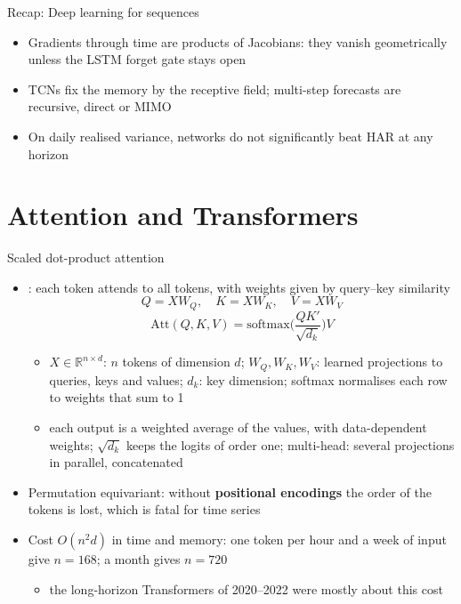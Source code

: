 \begin{frame}{Recap: Deep learning for sequences}
\itemsize{\small}
\begin{itemize}
    \item Gradients through time are products of Jacobians: they vanish geometrically unless the LSTM forget gate stays open
    \item TCNs fix the memory by the receptive field; multi-step forecasts are recursive, direct or MIMO
    \item On daily realised variance, networks do not significantly beat HAR at any horizon
\end{itemize}
\end{frame}


\section{Attention and Transformers}

\begin{frame}{Scaled dot-product attention}
\itemsize{\small}
\begin{itemize}
    \item {}: each token attends to all tokens, with weights given by query--key similarity
    \[ Q = XW_Q, \quad K = XW_K, \quad V = XW_V \]
    \[ \mathrm{Att}(Q, K, V) = \mathrm{softmax}\Big(\frac{QK'}{\sqrt{d_k}}\Big)V \]
    \begin{itemize}
        \item $X \in \mathbb R^{n\times d}$: $n$ tokens of dimension $d$; $W_Q, W_K, W_V$: learned projections to queries, keys and values; $d_k$: key dimension; softmax normalises each row to weights that sum to 1
        \item each output is a weighted average of the values, with data-dependent weights; $\sqrt{d_k}$ keeps the logits of order one; multi-head: several projections in parallel, concatenated
    \end{itemize}
    \item Permutation equivariant: without \textbf{positional encodings} the order of the tokens is lost, which is fatal for time series
    \item Cost $O(n^2 d)$ in time and memory: one token per hour and a week of input give $n = 168$; a month gives $n = 720$
    \begin{itemize}
        \item the long-horizon Transformers of 2020--2022 were mostly about this cost
    \end{itemize}
\end{itemize}
\end{frame}

